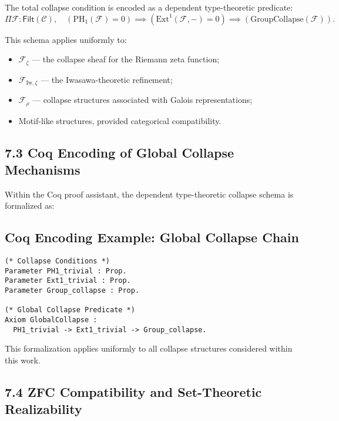 \documentclass[11pt]{article}
\begin{document}
The total collapse condition is encoded as a dependent type-theoretic predicate:
\[
\Pi \mathcal{F} : \mathsf{Filt}(\mathcal{C}), \quad 
\left( \mathrm{PH}_1(\mathcal{F}) = 0 \right) \implies 
\left( \mathrm{Ext}^1(\mathcal{F}, -) = 0 \right) \implies 
\left( \mathrm{GroupCollapse}(\mathcal{F}) \right).
\]

This schema applies uniformly to:

\begin{itemize}
    \item $\mathcal{F}_{\zeta}$ — the collapse sheaf for the Riemann zeta function;
    \item $\mathcal{F}_{\mathrm{Iw}, \zeta}$ — the Iwasawa-theoretic refinement;
    \item $\mathcal{F}_\rho$ — collapse structures associated with Galois representations;
    \item Motif-like structures, provided categorical compatibility.
\end{itemize}

\subsection*{7.3 Coq Encoding of Global Collapse Mechanisms}

Within the Coq proof assistant, the dependent type-theoretic collapse schema is formalized as:

\subsection*{Coq Encoding Example: Global Collapse Chain}

\begin{lstlisting}[language=Coq, caption=Type-Theoretic Collapse Formalization, captionpos=b]
(* Collapse Conditions *)
Parameter PH1_trivial : Prop.
Parameter Ext1_trivial : Prop.
Parameter Group_collapse : Prop.

(* Global Collapse Predicate *)
Axiom GlobalCollapse :
  PH1_trivial -> Ext1_trivial -> Group_collapse.
\end{lstlisting}

This formalization applies uniformly to all collapse structures considered within this work.

\subsection*{7.4 ZFC Compatibility and Set-Theoretic Realizability}
\end{document}
